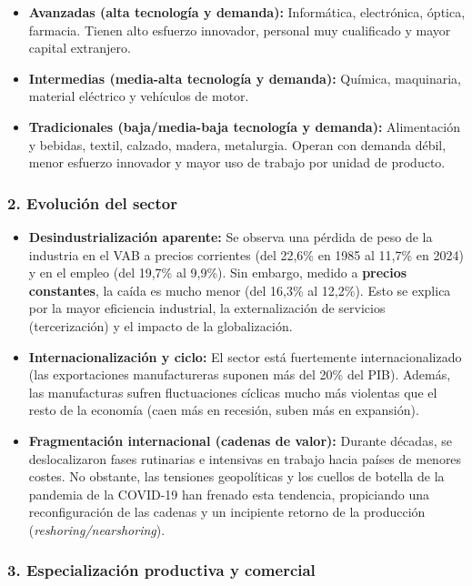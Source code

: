\begin{itemize}
  \item \textbf{Avanzadas (alta tecnología y demanda):} Informática, electrónica, óptica, farmacia. Tienen alto esfuerzo innovador, personal muy cualificado y mayor capital extranjero.
  \item \textbf{Intermedias (media-alta tecnología y demanda):} Química, maquinaria, material eléctrico y vehículos de motor.
  \item \textbf{Tradicionales (baja/media-baja tecnología y demanda):} Alimentación y bebidas, textil, calzado, madera, metalurgia. Operan con demanda débil, menor esfuerzo innovador y mayor uso de trabajo por unidad de producto.
\end{itemize}

\subsubsection*{2. Evolución del sector}

\begin{itemize}
  \item \textbf{Desindustrialización aparente:} Se observa una pérdida de peso de la industria en el VAB a precios corrientes (del 22,6\% en 1985 al 11,7\% en 2024) y en el empleo (del 19,7\% al 9,9\%). Sin embargo, medido a \textbf{precios constantes}, la caída es mucho menor (del 16,3\% al 12,2\%). Esto se explica por la mayor eficiencia industrial, la externalización de servicios (tercerización) y el impacto de la globalización.
  \item \textbf{Internacionalización y ciclo:} El sector está fuertemente internacionalizado (las exportaciones manufactureras suponen más del 20\% del PIB). Además, las manufacturas sufren fluctuaciones cíclicas mucho más violentas que el resto de la economía (caen más en recesión, suben más en expansión).
  \item \textbf{Fragmentación internacional (cadenas de valor):} Durante décadas, se deslocalizaron fases rutinarias e intensivas en trabajo hacia países de menores costes. No obstante, las tensiones geopolíticas y los cuellos de botella de la pandemia de la COVID-19 han frenado esta tendencia, propiciando una reconfiguración de las cadenas y un incipiente retorno de la producción (\textit{reshoring/nearshoring}).
\end{itemize}

\subsubsection*{3. Especialización productiva y comercial}

